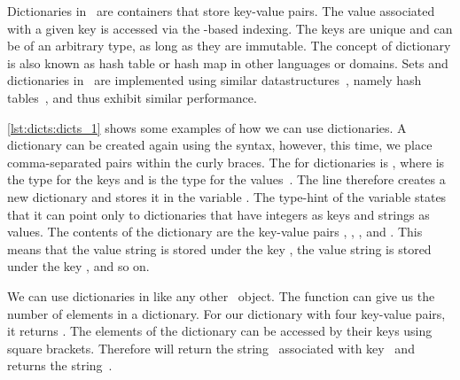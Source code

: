 %
\label{sec:dictionaries}%
%
%
%
Dictionaries in \python\ are containers that store key-value pairs.
The value associated with a given key is accessed via the \pythonil{[...]}\pythonIdx{[\idxdots]}-based indexing.
The keys are unique and can be of an arbitrary type, as long as they are immutable.
The concept of dictionary is also known as hash table or hash map in other languages or domains.
Sets and dictionaries in \python\ are implemented using similar datastructures~\cite{B2023T}, namely hash tables~\cite{K1998SAS,CLRS2009ITA,SKS2019DSC}, and thus exhibit similar performance.%
%
\begin{sloppypar}%
\cref{lst:dicts:dicts_1} shows some examples of how we can use dictionaries.
A dictionary can be created again using the  syntax, however, this time, we place comma-separated  pairs within the curly braces.
The  for dictionaries is , where  is the type for the keys and  is the type for the values~\cite{PEP585}.
The line  therefore creates a new dictionary and stores it in the variable .
The type-hint of the variable states that it can point only to dictionaries that have integers as keys and strings as values.
The contents of the dictionary are the key-value pairs , , , and .
This means that the value string  is stored under the key , the value string  is stored under the key , and so on.%
\end{sloppypar}%
%
We can use dictionaries in  like any other \python\ object.
The function  can give us the number of elements in a dictionary.
For our dictionary  with four key-value pairs, it returns .
The elements of the dictionary can be accessed by their keys using square brackets.
Therefore  will return the string~ associated with key~ and  returns the string~.%
%
